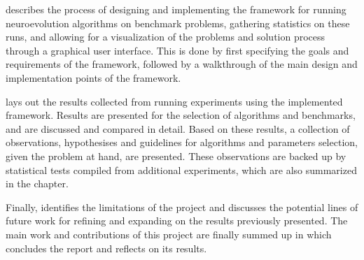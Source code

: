  describes the process of designing and implementing the framework for running neuroevolution algorithms on benchmark problems,
gathering statistics on these runs, and allowing for a visualization of the problems and solution process through a graphical user interface. This is done by first
specifying the goals and requirements of the framework, followed by a walkthrough of the main design and implementation points of the framework.

 lays out the results collected from running experiments using the implemented framework.
Results are presented for the selection of algorithms and benchmarks, and are discussed and compared in detail. Based on these results, a collection of
observations, hypothesises and guidelines for algorithms and parameters selection, given the problem at hand, are presented. These observations are
backed up by statistical tests compiled from additional experiments, which are also summarized in the chapter.

Finally,  identifies the limitations of the project and discusses the potential lines of future work for refining and expanding on the results
previously presented. The main work and contributions of this project are finally summed up in  which concludes the report and reflects on its
results.
